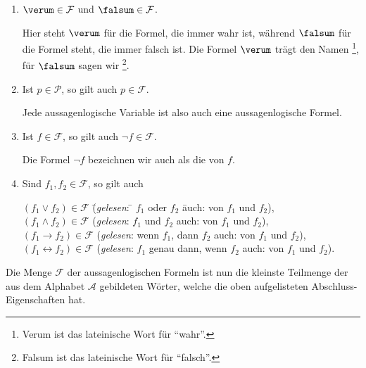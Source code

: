 \begin{enumerate}
\item $\verum \in \mathcal{F}$ und $\falsum \in \mathcal{F}$.

      Hier steht $\verum$   für die Formel, die immer wahr ist, während $\falsum$
        für die 
      Formel steht, die immer falsch ist.  Die Formel $\verum$ trägt den Namen
      \footnote{Verum ist das lateinische Wort für ``wahr''.},  für $\falsum$ sagen wir  
      \footnote{Falsum ist das lateinische Wort für ``falsch''.}.
\item Ist $p \in \mathcal{P}$, so gilt auch $p \in \mathcal{F}$.

      Jede aussagenlogische Variable ist also auch eine aussagenlogische Formel.
\item Ist $f \in \mathcal{F}$, so gilt auch $\neg f \in \mathcal{F}$.

      Die Formel $\neg f$  bezeichnen wir auch als die  von $f$.
\item Sind $f_1, f_2 \in \mathcal{F}$, so gilt auch
      \begin{tabbing}
        $(f_1 \vee f_2) \in \mathcal{F}$  \hspace*{0.5cm} \= (\textsl{gelesen}: \quad \= $f_1$ oder $f_2$ \hspace*{2.5cm} \=
         auch:  von $f_1$ und $f_2$), \\
        $(f_1 \wedge f_2) \in \mathcal{F}$  \> (\textsl{gelesen}: \> $f_1$ und $f_2$ \>
         auch:  von $f_1$ und $f_2$), \\
        $(f_1 \rightarrow f_2) \in \mathcal{F}$  \> (\textsl{gelesen}:       \> wenn $f_1$, dann $f_2$ \>
         auch:  von $f_1$ und $f_2$), \\
        $(f_1 \leftrightarrow f_2) \in \mathcal{F}$  \> (\textsl{gelesen}:       \> $f_1$ genau dann, wenn $f_2$ \>
         auch:  von $f_1$ und $f_2$).            
      \end{tabbing}
\end{enumerate}
Die Menge $\mathcal{F}$ der aussagenlogischen Formeln ist nun die kleinste Teilmenge der aus dem Alphabet $\mathcal{A}$
gebildeten Wörter, welche die oben aufgelisteten Abschluss-Eigenschaften hat.

